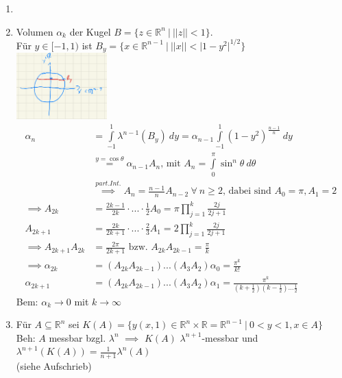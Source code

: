   \begin{example}
    \begin{enumerate}
      \item[]
      \item Volumen $\alpha_k$ der Kugel $B=\{z \in \mathbb{R}^n \ | \ ||z|| < 1\}.$\\
        Für $y \in [-1,1)$ ist $B_y = \{x \in \mathbb{R}^{n-1} \ | \ ||x|| < |1-y^2|^{1/2}\}$\\
        \includegraphics[width=3.5cm]{img/VI_Bsp_3_Kreis.png}
        \begin{align*}
          \alpha_n &=  \int\limits_{-1}^1 \lambda^{n-1}(B_y) \ dy = \alpha_{n-1} \int\limits_{-1}^1 (1-y^2)^{\frac{n-1}{n}} \ dy\\
          &\stackrel{y=\cos \theta}{=} \alpha_{n-1} A_n \text{, mit } A_n = \int\limits_0^{\pi} \sin^n\theta \ d\theta\\
          &\stackrel{part. Int.}{\implies} A_n = \frac{n-1}{n} A_{n-2} \ \forall \ n \geq 2 \text{, dabei sind } A_0 = \pi, A_1 = 2\\
          \implies A_{2k} &= \frac{2k-1}{2k} \cdot ... \cdot \frac{1}{2} A_0 = \pi \prod\limits_{j=1}^k \frac{2j}{2j+1}\\
          A_{2k+1} &= \frac{2k}{2k+1} \cdot ... \cdot \frac{2}{3} A_1 =2 \prod\limits_{j=1}^k \frac{2j}{2j+1}\\
          \implies A_{2k+1} A_{2k} &= \frac{2\pi}{2k+1} \text{ bzw. } A_{2k} A_{2k-1} = \frac{\pi}{k}\\
          \implies \alpha_{2k} &= (A_{2k}A_{2k-1}) ... (A_3 A_2) \alpha_0 = \frac{\pi^k}{k!}\\
          \alpha_{2k+1} &= (A_{2k}A_{2k-1}) ... (A_3 A_2) \alpha_1 = \frac{\pi^k}{(k+\frac{1}{2})(k-\frac{1}{2})...\frac{1}{2}}
        \end{align*}
        Bem: $\alpha_k \to 0$ mit $k \to \infty$
      \item Für $A \subseteq \mathbb{R}^n$ sei $K(A) = \{y (x,1) \in \mathbb{R}^n \times \mathbb{R} = \mathbb{R}^{n-1} \ | \ 0<y<1, x\in A\}$\\
        Beh: $A$ messbar bzgl. $\lambda^n$ $\implies$ $K(A)$ $\lambda^{n+1}$-messbar und $\lambda^{n+1}(K(A)) = \frac{1}{n+1}\lambda^n(A)$\\
        (siehe Aufschrieb)
    \end{enumerate}
  \end{example}

